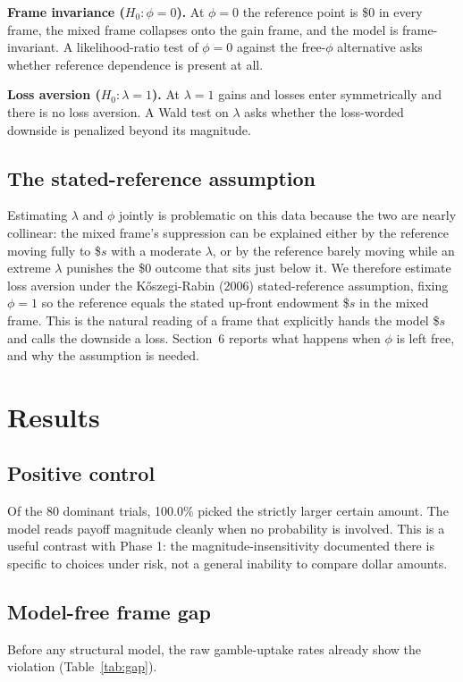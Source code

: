 \documentclass[11pt]{article}
\begin{document}
\textbf{Frame invariance ($H_0: \phi = 0$).} At $\phi = 0$ the reference point is \$0 in every frame,
the mixed frame collapses onto the gain frame, and the model is frame-invariant. A likelihood-ratio test
of $\phi = 0$ against the free-$\phi$ alternative asks whether reference dependence is present at all.

\textbf{Loss aversion ($H_0: \lambda = 1$).} At $\lambda = 1$ gains and losses enter symmetrically and
there is no loss aversion. A Wald test on $\lambda$ asks whether the loss-worded downside is penalized
beyond its magnitude.

\subsection{The stated-reference assumption}
Estimating $\lambda$ and $\phi$ jointly is problematic on this data because the two are nearly collinear:
the mixed frame's suppression can be explained either by the reference moving fully to \$$s$ with a
moderate $\lambda$, or by the reference barely moving while an extreme $\lambda$ punishes the \$0 outcome
that sits just below it. We therefore estimate loss aversion under the K\H{o}szegi-Rabin (2006)
stated-reference assumption, fixing $\phi = 1$ so the reference equals the stated up-front endowment
\$$s$ in the mixed frame. This is the natural reading of a frame that explicitly hands the model \$$s$
and calls the downside a loss. Section~6 reports what happens when $\phi$ is left free, and why the
assumption is needed.

\section{Results}

\subsection{Positive control}
Of the 80 dominant trials, 100.0\% picked the strictly larger certain amount. The model reads payoff
magnitude cleanly when no probability is involved. This is a useful contrast with Phase 1: the
magnitude-insensitivity documented there is specific to choices under risk, not a general inability to
compare dollar amounts.

\subsection{Model-free frame gap}
Before any structural model, the raw gamble-uptake rates already show the violation (Table~\ref{tab:gap}).
\end{document}
